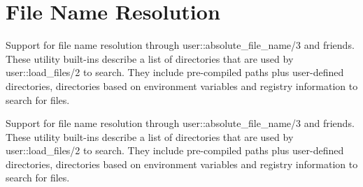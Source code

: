 \hypertarget{group__absolute__file__name}{}\section{File Name Resolution}
\label{group__absolute__file__name}


Support for file name resolution through user\+::absolute\+\_\+file\+\_\+name/3 and friends. These utility built-\/ins describe a list of directories that are used by user\+::load\+\_\+files/2 to search. They include pre-\/compiled paths plus user-\/defined directories, directories based on environment variables and registry information to search for files.  


Support for file name resolution through user\+::absolute\+\_\+file\+\_\+name/3 and friends. These utility built-\/ins describe a list of directories that are used by user\+::load\+\_\+files/2 to search. They include pre-\/compiled paths plus user-\/defined directories, directories based on environment variables and registry information to search for files. 

